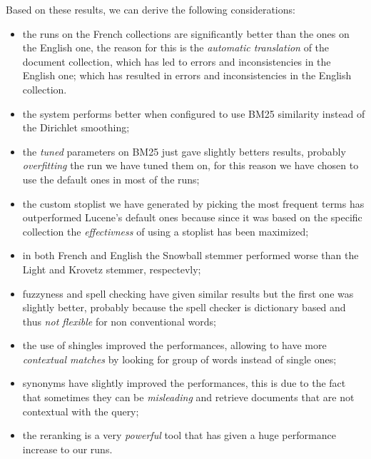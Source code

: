 \FloatBarrier

Based on these results, we can derive the following considerations:

\begin{itemize}
	\item the runs on the French collections are significantly better than the ones on the English one, the reason for this is the \emph{automatic translation} of the document collection, which has led to errors and inconsistencies in the English one;
which has resulted in errors and inconsistencies in the English collection. 
	\item the system performs better when configured to use BM25 similarity instead of the Dirichlet smoothing;
	\item the \emph{tuned} parameters on BM25 just gave slightly betters results, probably \emph{overfitting} the run we have tuned them on, for this reason we have chosen to use the default ones in most of the runs;
	\item the custom stoplist we have generated by picking the most frequent terms has outperformed Lucene's default ones because since it was based on the specific collection the \emph{effectivness} of using a stoplist has been maximized;
	\item in both French and English the Snowball stemmer performed worse than the Light and Krovetz stemmer, respectevly;
	\item fuzzyness and spell checking have given similar results but the first one was slightly better, probably because the spell checker is dictionary based and thus \emph{not flexible} for non conventional words;
	\item the use of shingles improved the performances, allowing to have more \emph{contextual matches} by looking for group of words instead of single ones;
	\item synonyms have slightly improved the performances, this is due to the fact that sometimes they can be \emph{misleading} and retrieve documents that are not contextual with the query;
	\item the reranking is a very \emph{powerful} tool that has given a huge performance increase to our runs.
\end{itemize}

